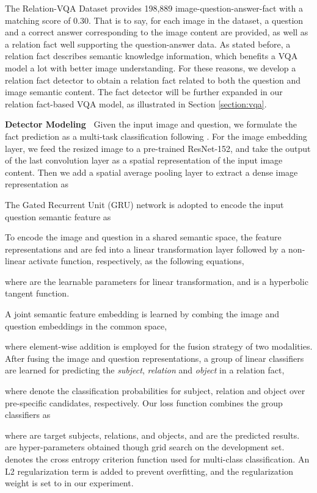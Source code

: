 \documentclass[sigconf]{acmart}
\begin{document}
The Relation-VQA Dataset provides 198,889 image-question-answer-fact with a matching score of 0.30. That is to say, for each image in the dataset, a question and a correct answer corresponding to the image content are provided, as well as a relation fact well supporting the question-answer data. As stated before, a relation fact describes semantic knowledge information, which benefits a VQA model a lot with better image understanding. For these reasons, we develop a relation fact detector to obtain a relation fact related to both the question and image semantic content. The fact detector will be further expanded in our relation fact-based VQA model, as illustrated in Section \ref{section:vqa}.



\textbf{Detector Modeling~} Given the input image and question, we formulate the fact prediction
as a multi-task classification following \cite{li2017vip,liang2017deep}. 
For the image embedding layer, we feed the resized image to a pre-trained ResNet-152\cite{he2016deep},
and take the output of the last convolution layer as a spatial representation of the input image content.
Then we add a spatial average pooling layer to extract a dense image representation   as

The Gated Recurrent Unit (GRU) network is adopted to encode the input question semantic feature as 


To encode the image and question in a shared semantic space, the feature representations  and 
are fed into a linear transformation layer followed by a non-linear activate function, respectively, as the following equations, 

where  are the learnable parameters for linear transformation,
and  is a hyperbolic tangent function.
	
A joint semantic feature embedding is learned by combing the image and question embeddings in the common space,

where element-wise addition is employed for the fusion strategy of two modalities. After fusing the image and question representations, a group of linear classifiers are learned for predicting the \textit{subject}, \textit{relation} and \textit{object} in a relation fact,  

where  denote the classification probabilities for subject, relation and  object over pre-specific candidates, respectively. Our loss function combines the group classifiers as

where  are target subjects, relations, and objects, and  are the predicted results.  are hyper-parameters obtained though grid search on the development set.
 denotes the cross entropy criterion function used for multi-class classification. An L2 regularization term is added to prevent overfitting, and the regularization weight  is set to  in our experiment.
\end{document}
